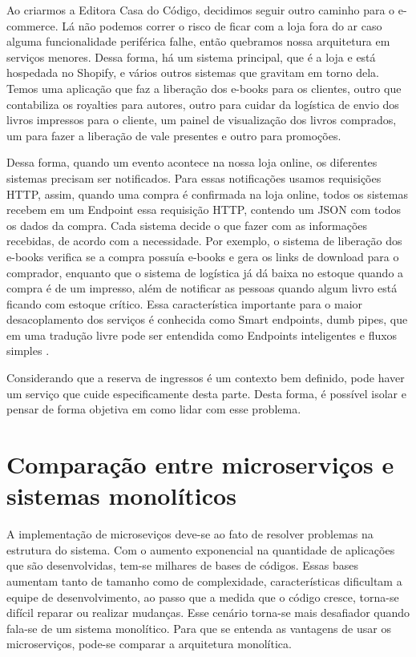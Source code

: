 \begin{citacao}

Ao criarmos a Editora Casa do Código, decidimos seguir outro caminho para o e-commerce.
Lá não podemos correr o risco de ficar com a loja fora do ar caso alguma funcionalidade
periférica falhe, então quebramos nossa arquitetura em serviços menores. Dessa forma, há
um sistema principal, que é a loja e está hospedada no Shopify, e vários outros sistemas
que gravitam em torno dela. Temos uma aplicação que faz a liberação dos e-books para os
clientes, outro que contabiliza os royalties para autores, outro para cuidar da logística
de envio dos livros impressos para o cliente, um painel de visualização dos livros comprados,
um para fazer a liberação de vale presentes e outro para promoções.

Dessa forma, quando um evento acontece na nossa loja online, os diferentes sistemas precisam
ser notificados. Para essas notificações usamos requisições HTTP, assim, quando uma compra
é confirmada na loja online, todos os sistemas recebem em um Endpoint essa requisição HTTP,
contendo um JSON com todos os dados da compra. Cada sistema decide o que fazer com as informações
recebidas, de acordo com a necessidade. Por exemplo, o sistema de liberação dos e-books verifica
se a compra possuía e-books e gera os links de download para o comprador, enquanto que o sistema
de logística já dá baixa no estoque quando a compra é de um impresso, além de notificar as pessoas
quando algum livro está ficando com estoque crítico. Essa característica importante para o maior
desacoplamento dos serviços é conhecida como Smart endpoints, dumb pipes, que em uma tradução
livre pode ser entendida como Endpoints inteligentes e fluxos
simples \cite{arquitetura-de-microservicos-ou-monolitica}.

\end{citacao}


Considerando que a reserva de ingressos é um contexto bem definido, pode haver um serviço que cuide
especificamente desta parte. Desta forma, é possível isolar e pensar de forma objetiva em como
lidar com esse problema.

\section{Comparação entre microserviços e sistemas monolíticos}\label{microservicos-monoliticos}
A implementação de microseviços deve-se ao fato de resolver problemas na estrutura do sistema. Com o aumento exponencial
na quantidade de aplicações que são desenvolvidas, tem-se milhares de bases de códigos. Essas bases
aumentam tanto de tamanho como de complexidade, características dificultam a equipe de desenvolvimento, ao passo que a
medida que o código cresce, torna-se difícil reparar ou realizar mudanças. Esse cenário torna-se mais desafiador quando
fala-se de um sistema monolítico. Para que se entenda as vantagens de usar os microserviços, pode-se comparar a arquitetura
monolítica.


